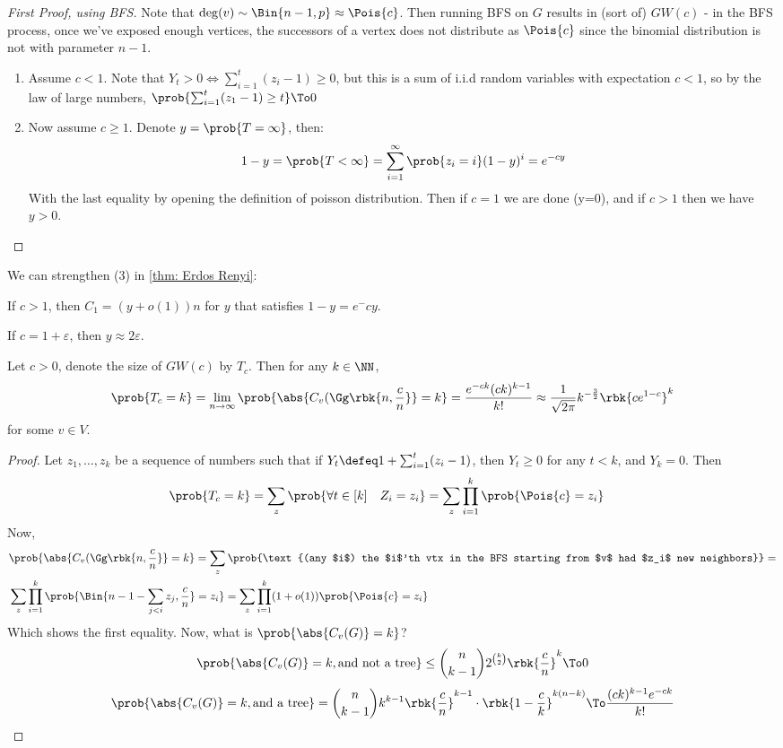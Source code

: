 \documentclass[a4paper, 11pt, oneside]{book}
\begin{document}
	\begin{proof}
		[First Proof, using BFS]
		Note that $\deg(v)\sim \Bin{n-1, p}\approx \Pois{c}$. Then running BFS on $G$ results in (sort of) $GW(c)$ - in the BFS process, once we've exposed enough vertices, the successors of a vertex does not distribute as $\Pois{c}$ since the binomial distribution is not with parameter $n-1$. \\
		\begin{enumerate}
			\item Assume $c<1$. Note that $Y_t > 0 \iff \sum_{i=1}^t (z_i-1) \ge 0$, but this is a sum of i.i.d random variables with expectation $c < 1$, so by the law of large numbers, $\prob{\sum_{i=1}^t (z_1-1) \ge t}\To 0$
			\item Now assume $c\ge 1$. Denote $y = \prob{T=\infty}$, then:
			\[
			1-y = \prob{T < \infty} = \sum_{i=1}^\infty \prob{z_i = i}(1-y)^i = e^{-cy}
			\]
			With the last equality by opening the definition of poisson distribution. Then if $c =1$ we are done (y=0), and if $c>1$ then we have $y>0$.
		\end{enumerate}
	\end{proof}
	We can strengthen (3) in \ref{thm: Erdos Renyi}:
	\begin{claim}
		If $c>1$, then $C_1 = (y+o(1))n$ for $y$ that satisfies $1-y = e^-{cy}$.
	\end{claim}
	\begin{remark}
		If $c = 1+\varepsilon$, then $y \approx 2\varepsilon$.
	\end{remark}
	\begin{thm}
		Let $c>0$, denote the size of $GW(c)$ by $T_c$. Then for any $k\in \NN$,
		\[
		\prob{T_c = k} = \lim_{n\to \infty}\prob{\abs{C_v(\Gg\rbk{n,\frac{c}{n}}} = k} =\frac{ e^{-ck}(ck)^{k-1}}{k!} \approx\frac{1}{\sqrt{2\pi}}k^{-\frac{3}{2}}\rbk{ce^{1-c}}^k
		\]
		for some $v\in V$.
	\end{thm}
	\begin{proof}
		Let $z_1,\ldots,z_k$ be a sequence of numbers such that if $Y_t\defeq 1 + \sum_{i=1}^t(z_i-1)$, then $Y_t\ge 0$ for any $t<k$, and $Y_k = 0$. Then 
		\begin{align*}
			& \prob{T_c = k} = \sum_{z} \prob{\forall t\in [k]\quad Z_i = z_i}	= \sum_{z} \prod_{i=1}^k\prob{\Pois{c} = z_i}	
		\end{align*}
		Now,
		\begin{align*}
			& \prob{\abs{C_v(\Gg\rbk{n,\frac{c}{n}}} = k} = \sum_z \prob{\text{(any $i$) the $i$'th vtx in the BFS starting from $v$ had $z_i$ new neighbors}} = \\
			&\sum_z\prod_{i=1}^k\prob{\Bin{n-1-\sum_{j<i}z_j,\frac{c}{n}} = z_i} = \sum_z \prod_{i=1}^k(1+o(1))\prob{\Pois{c} = z_i}
		\end{align*}
		Which shows the first equality. 
		Now, what is $\prob{\abs{C_v(G)} = k}$?
		\[
		\prob{\abs{C_v(G)} = k, \text{and not a tree}}\le {n\choose k-1}2^{k\choose 2}\rbk{\frac{c}{n}}^k\To 0
		\]
		\[
		\prob{\abs{C_v(G)} = k, \text{and a tree}}= {n\choose k-1}k^{k-1}\rbk{\frac{c}{n}}^{k-1}\cdot \rbk{1-\frac{c}{k}}^{k(n-k)} \To \frac{(ck)^{k-1}e^{-ck}}{k!}
		\]
	\end{proof}
\end{document}
